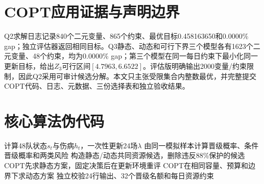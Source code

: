 \documentclass[UTF8,a4paper,zihao=-4,fontset=fandol]{ctexart}
\begin{document}
\section{COPT应用证据与声明边界}
Q2求解日志记录840个二元变量、865个约束、最优目标0.458163650和0.0000\% gap；独立评估器返回相同目标。Q3静态、动态和可行下界三个模型各有1623个二元变量、48个约束，均为0.0000\% gap；第三个模型在同一每日约束下最小化同一更新目标，给出$Z_3$可行区间$[4.7963,6.6522]$。评估版明确输出2000变量/约束限制，因此Q2采用可审计候选分解。本文只主张受限集合内整数最优，并完整提交COPT代码、日志、元数据、三份选择表和独立验收结果。

\section{核心算法伪代码}
\begin{algorithm}[H]
计算48队状态$s_t$与伤病$h_t$，一次性更新24场$\lambda$\;
由同一模拟样本计算晋级概率、条件晋级概率和两类风险\;
构造静态/动态共同资源候选，删除违反88\%保护的候选\;
COPT先求静态方案，固定决策后在更新环境重评\;
COPT在相同容量、预算和边界下求动态方案\;
独立校验24行输出、32个晋级名额和每日资源约束\;
\caption{统一信息截面的Q3模拟与双模型优化}
\end{algorithm}

\clearpage

\end{document}
